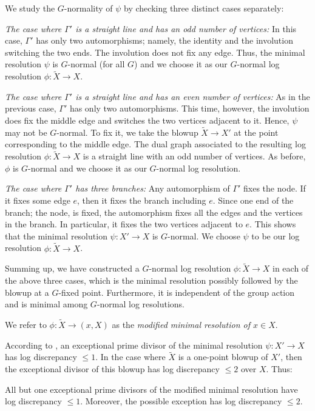 \documentclass[12pt]{amsart}
\theoremstyle{plain}   %
\theoremstyle{definition}    %
\theoremstyle{remark}    %
\numberwithin{equation}{theorem}
\begin{document}
We study the $G$-normality of $\psi$ by checking
three distinct cases separately:

\emph{The case where $\Gamma'$ is a straight line and has an odd number
of vertices:} In this case, $\Gamma'$ has only two automorphisms; namely,
the identity and the involution switching the two ends. The involution
does not fix any edge. Thus, the minimal resolution $\psi$ is $G$-normal (for all $G$)
and we choose it as our $G$-normal log resolution $\phi\colon\tilde{X}\to X$.

\emph{The case where $\Gamma'$ is a straight line and has an even
number of vertices:} As in the previous case, $\Gamma'$ has only two automorphisms. This time, however, the involution does fix the
middle edge and switches the two vertices adjacent to it. Hence, $\psi$ may not be $G$-normal. To fix it, we take the
blowup $\tilde{X}\to X'$ at the point corresponding to the middle
edge. The dual graph associated to the resulting log resolution $\phi\colon\tilde{X}\to X$
is a straight line with an odd number of vertices. As before, $\phi$ is $G$-normal and we choose it as our $G$-normal log
resolution. 

\emph{The case where $\Gamma'$ has three branches:} Any automorphism
of $\Gamma'$ fixes the node. If it fixes some edge $e$, then it
fixes the branch including $e$. Since one end of the branch; the
node, is fixed, the automorphism fixes all the edges and the vertices
in the branch. In particular, it fixes the two vertices adjacent to
$e$. This shows that the minimal resolution $\psi\colon X'\to X$
is $G$-normal. We choose $\psi$ to be our log resolution $\phi\colon\tilde{X}\to X$. 

Summing up, we have constructed a $G$-normal log resolution $\phi\colon\tilde{X}\to X$
in each of the above three cases, which is the minimal resolution possibly
followed by the blowup at a $G$-fixed point. Furthermore, it is independent of the group action and is minimal among $G$-normal log resolutions.
\begin{definition}
We refer to $\phi \colon \tilde{X} \to (x,X)$ as the \emph{modified minimal resolution
of $x\in X$}.
\end{definition}
According to \cite[Claim 2.26.4, p. 56]{KollarSingulaitieofMMP},
an exceptional prime divisor of the minimal resolution $\psi\colon X'\to X$
has log discrepancy $\leq 1$. In the case where $\tilde{X}$ is a one-point
blowup of $X'$, then the exceptional divisor of this blowup has log
discrepancy $\leq 2$ over $X$. Thus:
\begin{lemma}
\label{lem:log discrep at most 1}All but one exceptional prime divisors
of the modified minimal resolution have log discrepancy $\le1$. Moreover,
the possible exception has log discrepancy $\le2$. 
\end{lemma}
\end{document}

